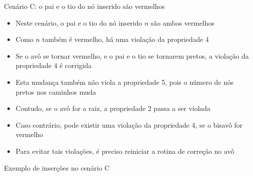 \begin{frame}[fragile]{Cenário C: o pai e o tio do nó inserido são vermelhos}

    \begin{itemize}
        \item Neste cenário, o pai e o tio do nó inserido $n$ são ambos vermelhos

        \item Como $n$ também é vermelho, há uma violação da propriedade 4

        \item Se o avô se tornar vermelho, e o pai e o tio se tornarem pretos, a violação da
            propriedade 4 é corrigida

        \item Esta mudança também não viola a propriedade 5, pois o número de nós pretos
            nos caminhos muda

        \item Contudo, se o avô for a raiz, a propriedade 2 passa a ser violada

        \item Caso contrário, pode existir uma violação da propriedade 4, se o bisavô for
            vermelho

        \item Para evitar tais violações, é preciso reiniciar a rotina de correção no avô
    \end{itemize}

\end{frame}

\begin{frame}[fragile]{Exemplo de inserções no cenário C}


\end{frame}

